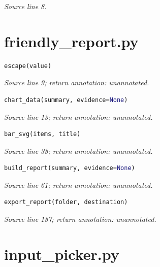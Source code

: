 {\small \textit{Source line 8.}}

\section{friendly\_report.py}




\begin{lstlisting}[language=Python]
escape(value)
\end{lstlisting}


{\small \textit{Source line 9; return annotation: unannotated.}}



\begin{lstlisting}[language=Python]
chart_data(summary, evidence=None)
\end{lstlisting}


{\small \textit{Source line 13; return annotation: unannotated.}}



\begin{lstlisting}[language=Python]
bar_svg(items, title)
\end{lstlisting}


{\small \textit{Source line 38; return annotation: unannotated.}}



\begin{lstlisting}[language=Python]
build_report(summary, evidence=None)
\end{lstlisting}


{\small \textit{Source line 61; return annotation: unannotated.}}



\begin{lstlisting}[language=Python]
export_report(folder, destination)
\end{lstlisting}


{\small \textit{Source line 187; return annotation: unannotated.}}

\section{input\_picker.py}




